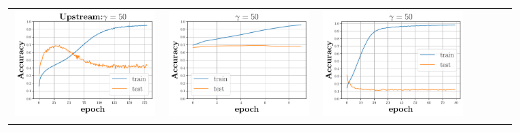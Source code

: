 \begin{minipage}{0.99\columnwidth}
{\begin{tabular}{cccccc}
\\
\includegraphics[scale=0.125]{figs/relu_50.pdf}&
\includegraphics[scale=0.125]{figs/galu_50_good.pdf}&
\includegraphics[scale=0.125]{figs/galu_50_bad.pdf}&

\end{tabular}}
\end{minipage}
